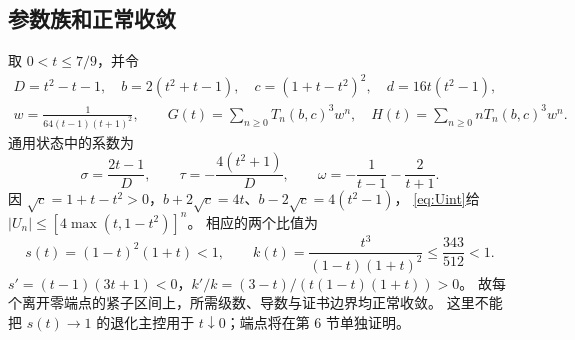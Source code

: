 \documentclass[11pt,a4paper]{article}
\numberwithin{equation}{section}
\theoremstyle{remark}\newtheorem{remark}[theorem]{说明}
\begin{document}
\subsection{参数族和正常收敛}
取 $0<t\le7/9$，并令
\begin{equation}\label{eq:fam3}
 \begin{gathered}
 D=t^2-t-1,\quad b=2(t^2+t-1),\quad c=(1+t-t^2)^2,\quad d=16t(t^2-1),\\
 w=\frac1{64(t-1)(t+1)^2},\qquad
 G(t)=\sum_{n\ge0}T_n(b,c)^3w^n,\quad H(t)=\sum_{n\ge0}nT_n(b,c)^3w^n.
 \end{gathered}
\end{equation}
通用状态中的系数为
\begin{equation}\label{eq:sigtau3}
 \sigma=\frac{2t-1}{D},\qquad\tau=-\frac{4(t^2+1)}D,\qquad
 \omega=-\frac1{t-1}-\frac2{t+1}.
\end{equation}
因 $\sqrt c=1+t-t^2>0$，$b+2\sqrt c=4t$、$b-2\sqrt c=4(t^2-1)$，
\eqref{eq:Uint}给 $|U_n|\le[4\max(t,1-t^2)]^n$。
相应的两个比值为
\begin{equation}\label{eq:ratio3}
 s(t)=(1-t)^2(1+t)<1,\qquad k(t)=\frac{t^3}{(1-t)(1+t)^2}\le\frac{343}{512}<1.
\end{equation}
$s'=(t-1)(3t+1)<0$，$k'/k=(3-t)/(t(1-t)(1+t))>0$。
故每个离开零端点的紧子区间上，所需级数、导数与证书边界均正常收敛。
这里不能把 $s(t)\to1$ 的退化主控用于 $t\downarrow0$；端点将在第 6 节单独证明。
\end{document}

